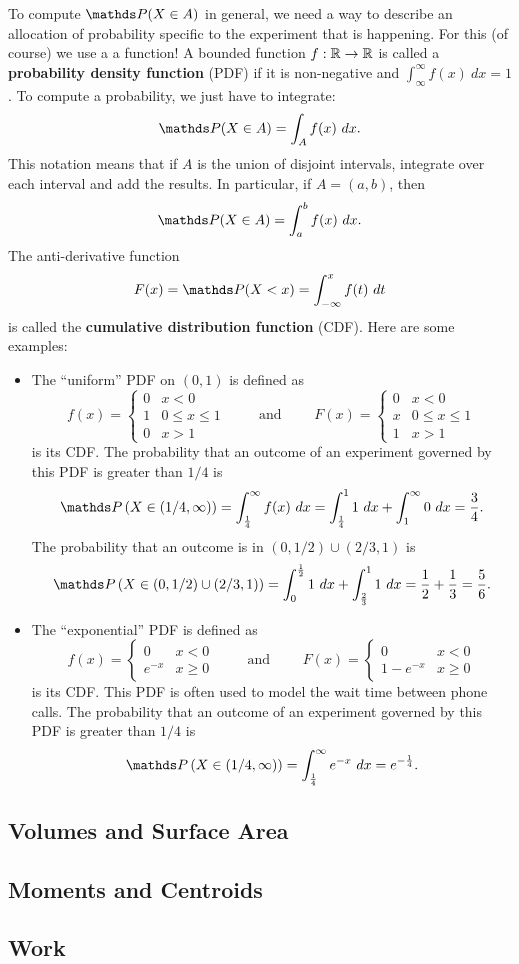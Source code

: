 To compute $\P(X\in A)$ in general, we need a way to describe an allocation of probability specific to the experiment that is happening. For this (of course) we use a a function! A bounded function $f:\mathbb{R} \to \mathbb{R}$ is called a \textbf{probability density function} (PDF) if it is non-negative and $\int_{\infty}^\infty f(x)\ dx= 1$. 
To compute a probability, we just have to integrate:
$$\P(X\in A) = \int_A f(x)\ dx.$$
This notation means that if $A$ is the union of disjoint intervals, integrate over each interval and add the results. In particular, if $A=(a,b)$, then 
$$\P(X\in A) = \int_a^b f(x)\ dx.$$
The anti-derivative function
$$F(x)=\P(X<x) = \int_{-\infty}^x f(t)\ dt$$
is called the \textbf{cumulative distribution function} (CDF). Here are some examples:
\begin{itemize}
\item The ``uniform'' PDF on $(0,1)$ is defined as
$$f(x)=\begin{cases}0 & x < 0\\ 1 & 0\leq x\leq 1\\ 0 & x>1\end{cases}
\quad\quad\text{ and } \quad\quad
F(x)=\begin{cases}0 & x < 0\\ x & 0\leq x\leq 1\\ 1 & x>1\end{cases}$$
is its CDF. The probability that an outcome of an experiment governed by this PDF is greater than $1/4$ is
$$\P\left(X\in(1/4,\infty)\right)
= \int_{\frac14}^{\infty}f(x)\ dx
= \int_{\frac14}^{1}1\ dx + \int_{1}^{\infty}0\ dx 
= \frac34.
$$
The probability that an outcome is in $(0,1/2)\cup(2/3,1)$ is
$$\P\left(X\in(0,1/2)\cup(2/3,1)\right)
= \int_0^{\frac12}1\ dx + \int_{\frac23}^11\ dx
= \frac12+\frac13 = \frac56.
$$

\item  The ``exponential'' PDF is defined as
$$f(x)=\begin{cases}0 & x < 0\\ e^{-x} & x\geq 0\end{cases}
\quad\quad\text{ and } \quad\quad
F(x)=\begin{cases}0 & x < 0\\1- e^{-x} & x\geq 0\end{cases}$$
is its CDF. This PDF is often used to model the wait time between phone calls. The probability that an outcome of an experiment governed by this PDF is greater than $1/4$ is
$$\P\left(X\in(1/4,\infty)\right)
= \int_{\frac14}^{\infty} e^{-x}\ dx
= e^{-\frac{1}{4}}.
$$

\end{itemize}





\subsection{Volumes and Surface Area}


\subsection{Moments and Centroids}


\subsection{Work}
